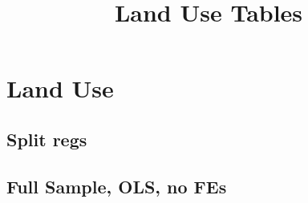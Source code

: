 \documentclass{article}
\title{Land Use Tables}
\begin{document}
\maketitle
\tableofcontents
{\footnotesize 
\listoffigures
\listoftables}
\clearpage

\section{Land Use}
\begin{landscape}




\clearpage

\clearpage


\clearpage

\clearpage

\section{Split regs}
\subsection{Full Sample, OLS, no FEs}

\clearpage

\clearpage



\end{landscape}
\end{document}
